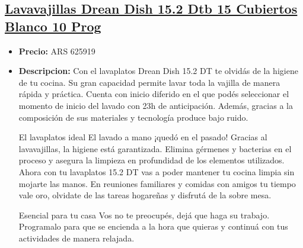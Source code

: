 \documentclass{article}
\begin{document}
    
    \begin{adjustwidth}{2em}{}

    \subsection{\underline{\href{https://www.mercadolibre.com.ar/lavavajillas-drean-dish-152-dtb-15-cubiertos-blanco-10-prog/p/MLA12211360}{Lavavajillas Drean Dish 15.2 Dtb 15 Cubiertos Blanco 10 Prog}}}
    \begin{itemize}
        \item \textbf{Precio:} ARS 625919
        \item \textbf{Descripcion:} Con el lavaplatos Drean Dish 15.2 DT te olvidás de la higiene de tu cocina. Su gran capacidad permite lavar toda la vajilla de manera rápida y práctica. Cuenta con inicio diferido en el que podés seleccionar el momento de inicio del lavado con 23h de anticipación. Además, gracias a la composición de sus materiales y tecnología produce bajo ruido.

El lavaplatos ideal
El lavado a mano ¡quedó en el pasado! Gracias al lavavajillas,  la higiene está garantizada. Elimina gérmenes y bacterias en el proceso y asegura la limpieza en profundidad de los elementos utilizados. Ahora con tu lavaplatos 15.2 DT vas a poder mantener tu cocina limpia sin mojarte las manos. En reuniones familiares y comidas con amigos tu tiempo vale oro, olvidate de las tareas hogareñas y disfrutá de la sobre mesa.

Esencial para tu casa
Vos no te preocupés, dejá que haga su trabajo. Programalo para que se encienda a la hora que quieras y continuá con tus actividades de manera relajada.


\end{itemize}
\end{adjustwidth}
\end{document}
